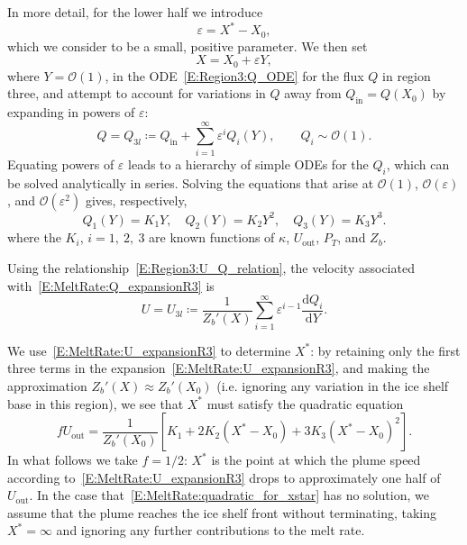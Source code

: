 \documentclass[openacc]{rsproca_new}%
\newcommand{\dd}[2]{\frac{\mathrm{d} #1}{\mathrm{d} #2}}
\newcommand{\order}[1]{\mathcal{O}(#1)}
\newcommand{\Pt}{\textit{P}_T}
\renewcommand{\in}{\text{in}} %
\newcommand{\out}{\text{out}}
\begin{document}
In more detail, for the lower half we introduce 
\begin{equation}
\varepsilon = X^* - X_0,
\end{equation}
which we consider to be a small, positive parameter. We then set 
\begin{equation}
X = X_0 + \varepsilon Y,
\end{equation}
where  $Y = \order{1}$, in the ODE~\eqref{E:Region3:Q_ODE} for the flux $Q$ in region three, and attempt to account for variations in $Q$ away from $Q_{\text{in}} = Q(X_0)$ by expanding in powers of $\varepsilon$:
\begin{equation}\label{E:MeltRate:Q_expansionR3}
Q = Q_{3l} \coloneqq   Q_\in  + \sum_{i = 1}^{\infty} \varepsilon^i Q_i(Y), \qquad Q_i \sim \order{1}.
 \end{equation}
Equating powers of $\varepsilon$ leads to a hierarchy of simple ODEs for the $Q_i$, which can be solved analytically in series. Solving the equations that arise at $\order{1}$, $\order{\varepsilon}$, and $\order{\varepsilon^2}$ gives, respectively,
\begin{equation}
Q_1(Y) = K_1 Y, \quad Q_2(Y) = K_2 Y^2, \quad Q_3(Y) =K_3 Y^3.
\end{equation}
where the $K_i$, $i = 1,~2,~3$ are known functions of $\kappa$, $U_{\text{out}}$, $P_T$, and $Z_b$.

Using the relationship~\eqref{E:Region3:U_Q_relation}, the velocity associated with~\eqref{E:MeltRate:Q_expansionR3} is
 \begin{equation}\label{E:MeltRate:U_expansionR3}
U = U_{3l} \coloneqq \frac{1}{Z_b'(X)} \sum_{i = 1}^{\infty} \varepsilon^{i-1} \dd{Q_i}{Y}.
\end{equation}

We use~\eqref{E:MeltRate:U_expansionR3} to determine $X^*$: by retaining only the first three terms in the expansion~\eqref{E:MeltRate:U_expansionR3}, and making the approximation  $Z_b'(X) \approx Z_b'(X_0)$ (i.e. ignoring any variation in the ice shelf base in this region), we see that $X^*$ must satisfy the quadratic equation
\begin{equation}\label{E:MeltRate:quadratic_for_xstar}
f U_\out = \frac{1}{Z_b'(X_0)}\left[K_1 + 2 K_2(X^* - X_0) + 3K_3(X^* - X_0)^2 \right].
\end{equation}
In what follows we take $f = 1/2$: $X^*$ is the point at which the plume speed according to~\eqref{E:MeltRate:U_expansionR3} drops to approximately one half of $U_\out$. In the case that~\eqref{E:MeltRate:quadratic_for_xstar} has no solution, we assume that the plume reaches the ice shelf front without terminating, taking $X^* = \infty$ and ignoring any further contributions to the melt rate.
\end{document}
